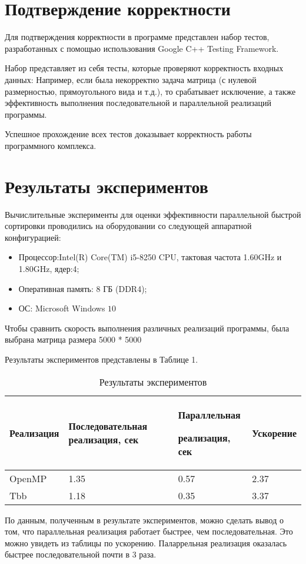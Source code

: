 \documentclass{report}
\begin{document}
\section*{Подтверждение корректности}
Для подтверждения корректности в программе представлен набор тестов, разработанных с помощью использования Google C++ Testing Framework.
\par Набор представляет из себя тесты, которые проверяют корректность входных данных: Например, если была некорректно задача матрица (с нулевой размерностью, прямоугольного вида и т.д.), то срабатывает исключение, а также эффективность выполнения последовательной и параллельной реализаций программы.
\par Успешное прохождение всех тестов доказывает корректность работы программного комплекса.
\newpage


\section*{Результаты экспериментов}
Вычислительные эксперименты для оценки эффективности параллельной быстрой сортировки проводились на оборудовании со следующей аппаратной конфигурацией:
\begin{itemize}
\item Процессор:Intel(R) Core(TM) i5-8250 CPU, тактовая частота 1.60GHz и 1.80GHz, ядер:4;
\item Оперативная память: 8 ГБ (DDR4);
\item ОС: Microsoft Windows $10$
\end{itemize}
\par Чтобы сравнить скорость выполнения различных реализаций программы, была выбрана матрица размера 5000 * 5000

Результаты экспериментов представлены в Таблице 1.

\begin{table}[h]
    \begin{tabular}{ | p{4cm} | p{4cm} | p{4cm} | p{4cm} | }
    \hline
    Реализация & Последовательная реализация, сек & Параллельная \par реализация, сек & Ускорение\\ \hline
    OpenMP & 1.35  & 0.57  & 2.37 \\ \hline
    Tbb    & 1.18  & 0.35  & 3.37 \\ \hline 
   
    \end{tabular}
    \caption{Результаты экспериментов}
\end{table}
\par По данным, полученным в результате экспериментов, можно сделать вывод о том, что параллельная реализация работает быстрее, чем последовательная. Это можно увидеть из таблицы по ускорению. Паларрельная реализация оказалась быстрее последовательной почти в 3 раза.
\newpage
 
\end{document}
